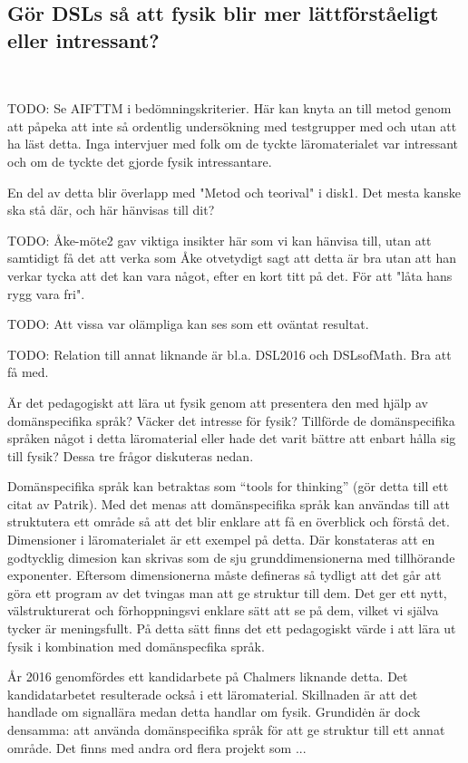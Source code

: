 \begin{binge}
\section{Gör DSLs så att fysik blir mer lättförståeligt eller
intressant?}~\label{sec:bara_fysik}

TODO: Se AIFTTM i bedömningskriterier. Här kan knyta an till metod genom att påpeka att inte så ordentlig undersökning med testgrupper med och utan att ha läst detta. Inga intervjuer med folk om de tyckte läromaterialet var intressant och om de tyckte det gjorde fysik intressantare.

En del av detta blir överlapp med "Metod och teorival" i disk1. Det mesta kanske ska stå där, och här hänvisas till dit?

TODO: Åke-möte2 gav viktiga insikter här som vi kan hänvisa till, utan att samtidigt få det att verka som Åke otvetydigt sagt att detta är bra utan att han verkar tycka att det kan vara något, efter en kort titt på det. För att "låta hans rygg vara fri".

TODO: Att vissa var olämpliga kan ses som ett oväntat resultat.

TODO: Relation till annat liknande är bl.a. DSL2016 och DSLsofMath. Bra att få med.

Är det pedagogiskt att lära ut fysik genom att presentera den med hjälp av domänspecifika språk? Väcker det intresse för fysik? Tillförde de domänspecifika språken något i detta läromaterial eller hade det varit bättre att enbart hålla sig till fysik? Dessa tre frågor diskuteras nedan.

Domänspecifika språk kan betraktas som ``tools for thinking'' (gör detta till ett citat av Patrik). Med det menas att domänspecifika språk kan användas till att struktutera ett område så att det blir enklare att få en överblick och förstå det. Dimensioner i läromaterialet är ett exempel på detta. Där konstateras att en godtycklig dimesion kan skrivas som de sju grunddimensionerna med tillhörande exponenter. Eftersom dimensionerna måste defineras så tydligt att det går att göra ett program av det tvingas man att ge struktur till dem. Det ger ett nytt, välstrukturerat och förhoppningsvi enklare sätt att se på dem, vilket vi själva tycker är meningsfullt. På detta sätt finns det ett pedagogiskt värde i att lära ut fysik i kombination med domänspecfika språk.

År 2016 genomfördes ett kandidarbete på Chalmers liknande detta. \cite{DSL2016} Det kandidatarbetet resulterade också i ett läromaterial. Skillnaden är att det handlade om signallära medan detta handlar om fysik. Grundidėn är dock densamma: att använda domänspecifika språk för att ge struktur till ett annat område. Det finns med andra ord flera projekt som ...




\end{binge}
